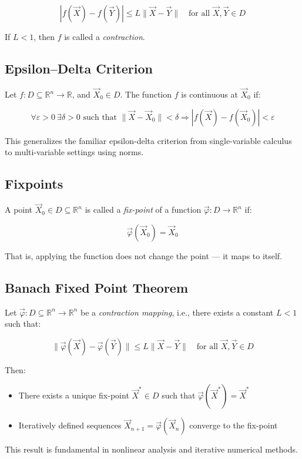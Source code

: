 \[
|f(\vec{X}) - f(\vec{Y})| \le L \|\vec{X} - \vec{Y}\| \quad \text{for all } \vec{X}, \vec{Y} \in D
\]

If \( L < 1 \), then \( f \) is called a \emph{contraction}.



\subsection{Epsilon–Delta Criterion}

Let \( f : D \subseteq \mathbb{R}^n \to \mathbb{R} \), and \( \vec{X}_0 \in D \). The function \( f \) is continuous at \( \vec{X}_0 \) if:

\[
\forall \varepsilon > 0 \ \exists \delta > 0 \text{ such that } \|\vec{X} - \vec{X}_0\| < \delta \Rightarrow |f(\vec{X}) - f(\vec{X}_0)| < \varepsilon
\]

This generalizes the familiar epsilon-delta criterion from single-variable calculus to multi-variable settings using norms.



\subsection{Fixpoints}
  
A point \( \vec{X}_0 \in D \subseteq \mathbb{R}^n \) is called a \emph{fix-point} of a function \( \vec{\varphi} : D \to \mathbb{R}^n \) if:

\[
\vec{\varphi}(\vec{X}_0) = \vec{X}_0
\]

That is, applying the function does not change the point — it maps to itself.



\subsection{Banach Fixed Point Theorem}

Let \( \vec{\varphi} : D \subseteq \mathbb{R}^n \to \mathbb{R}^n \) be a \emph{contraction mapping}, i.e., there exists a constant \( L < 1 \) such that:

\[
\|\vec{\varphi}(\vec{X}) - \vec{\varphi}(\vec{Y})\| \le L \|\vec{X} - \vec{Y}\| \quad \text{for all } \vec{X}, \vec{Y} \in D
\]

Then:
\begin{itemize}[label=\(-\)]
\item There exists a unique fix-point \( \vec{X}^* \in D \) such that \( \vec{\varphi}(\vec{X}^*) = \vec{X}^* \)
\item Iteratively defined sequences \( \vec{X}_{n+1} = \vec{\varphi}(\vec{X}_n) \) converge to the fix-point
\end{itemize}

This result is fundamental in nonlinear analysis and iterative numerical methods.



